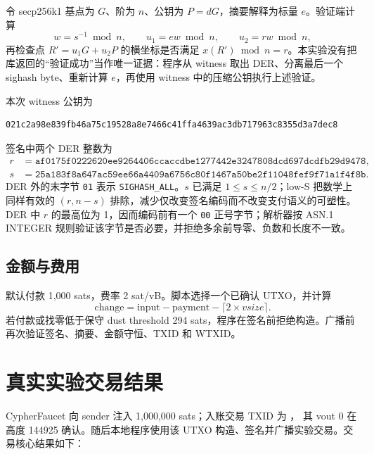 \documentclass[11pt,a4paper,fontset=none]{ctexart}
\begin{document}
令 secp256k1 基点为 $G$、阶为 $n$、公钥为 $P=dG$，摘要解释为标量 $e$。验证端计算
\[
w=s^{-1}\bmod n,\qquad u_1=ew\bmod n,\qquad u_2=rw\bmod n,
\]
再检查点 $R'=u_1G+u_2P$ 的横坐标是否满足 $x(R')\bmod n=r$。本实验没有把库返回的“验证成功”当作唯一证据：程序从 witness 取出 DER、分离最后一个 sighash byte、重新计算 $e$，再使用 witness 中的压缩公钥执行上述验证。

本次 witness 公钥为
\begin{lstlisting}[language={}]
021c2a98e839fb46a75c19528a8e7466c41ffa4639ac3db717963c8355d3a7dec8
\end{lstlisting}
签名中两个 DER 整数为
\begin{align*}
r&=\texttt{af0175f0222620ee9264406ccaccdbe1277442e3247808dcd697dcdfb29d9478},\\
s&=\texttt{25a183f8a647ac59ee66a4409a6756c80f1467a50be2f11048fef9f71a1f4f8b}.
\end{align*}
DER 外的末字节 \texttt{01} 表示 \texttt{SIGHASH\_ALL}。$s$ 已满足 $1\le s\le n/2$；low-S 把数学上同样有效的 $(r,n-s)$ 排除，减少仅改变签名编码而不改变支付语义的可塑性。DER 中 $r$ 的最高位为 1，因而编码前有一个 \texttt{00} 正号字节；解析器按 ASN.1 INTEGER 规则验证该字节是否必要，并拒绝多余前导零、负数和长度不一致。

\subsection{金额与费用}

默认付款 1,000 sats，费率 2 sat/vB。脚本选择一个已确认 UTXO，并计算
\[
\text{change}=\text{input}-\text{payment}-\lceil 2\times vsize\rceil.
\]
若付款或找零低于保守 dust threshold 294 sats，程序在签名前拒绝构造。广播前再次验证签名、摘要、金额守恒、TXID 和 WTXID。

\section{真实实验交易结果}

CypherFaucet 向 sender 注入 1,000,000 sats；入账交易 TXID 为
\texttt{}，
其 vout 0 在高度 144925 确认。随后本地程序使用该 UTXO 构造、签名并广播实验交易。交易核心结果如下：
\end{document}
